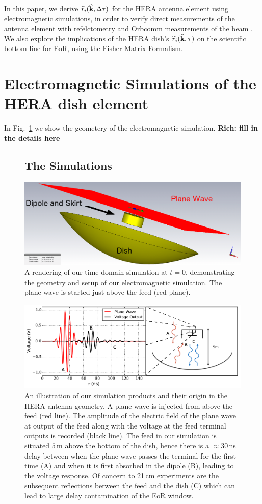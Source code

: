 \documentclass[onecolumn]{emulateapj}
\begin{document}
 In this paper, we derive $\widetilde{r}_i({\bf \widehat{k}},\Delta \tau)$ for the HERA antenna element using electromagnetic simulations, in order to verify direct measurements of the antenna element with refelctometry \citep{Patra:2015} and Orbcomm measurements of the beam \citep{Neben:2015b}. We also explore the implications of the HERA dish's $\widetilde{r}_i({\bf \widehat{k}},\tau)$ on the scientific bottom line for EoR, using the Fisher Matrix Formalism. 

\section{Electromagnetic Simulations of the HERA dish element}\label{sec:Simulations}
In Fig.~\ref{fig:SimulationSetup} we show the geometery of the electromagnetic simulation. {\bf Rich: fill in the details here}
\begin{figure}


\subsection{The Simulations}
\includegraphics[width=.5\textwidth]{figures/One_dish_Pfeed_render_pw_0deg.png}
\caption{A rendering of our time domain simulation at $t=0$, demonstrating the geometry and setup of our electromagnetic simulation. The plane wave is started just above the feed (red plane).}\label{fig:SimulationSetup}
\end{figure}

\begin{figure}
\includegraphics[width=\textwidth]{figures/SimulationIllustration.png}
\caption{An illustration of our simulation products and their origin in the HERA antenna geometry. A plane wave is injected from above the feed (red line). The amplitude of the electric field of the plane wave at output of the feed along with the voltage at the feed terminal outputs is recorded (black line). The feed in our simulation is situated $5$\,m above the bottom of the dish, hence there is a $\approx 30$\,ns delay between when the plane wave passes the terminal for the first time (A) and when it is first absorbed in the dipole (B), leading to the voltage response. Of concern to 21\,cm experiments are the subsequent reflections between the feed and the dish (C) which can lead to large delay contamination of the EoR window.}
\label{fig:Simulation}
\end{figure}
\end{document}
